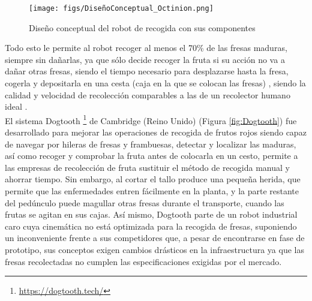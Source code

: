 \begin{figure} [H]
    \begin{center}
      \texttt{[image: figs/DiseñoConceptual\_Octinion.png]}
    \end{center}
    \caption{Diseño conceptual del robot de recogida con sus componentes}
    \label{fig:DiseñoConceptual_Octinion}
\end{figure}

Todo esto le permite al robot recoger al menos el 70\% de las fresas maduras, siempre sin dañarlas, ya que sólo decide recoger la fruta si su acción no va a dañar otras fresas, siendo el tiempo necesario para desplazarse hasta la fresa, cogerla y depositarla en una cesta (caja en la que se colocan las
fresas) %
, siendo la calidad y velocidad de recolección comparables a las de un recolector humano ideal \cite{DePreter18}.\\ %


El sistema Dogtooth \footnote{\url{https://dogtooth.tech/}} de Cambridge (Reino Unido) (Figura \ref{fig:Dogtooth}) fue desarrollado para mejorar las operaciones de recogida de frutos rojos siendo capaz de navegar por hileras de fresas y frambuesas, detectar y localizar las maduras, así como recoger y comprobar la fruta antes de colocarla en un cesto, permite a las empresas de recolección de fruta sustituir el método de recogida manual y ahorrar tiempo. Sin embargo, al cortar el tallo produce una pequeña herida, que permite que las enfermedades entren fácilmente en la planta, y la parte restante del pedúnculo puede magullar otras fresas durante el transporte, cuando las frutas se agitan en sus cajas. Así mismo, Dogtooth parte de un robot industrial caro cuya cinemática no está optimizada para la recogida de fresas, suponiendo un inconveniente frente a sus competidores que, a pesar de encontrarse en fase de prototipo, sus conceptos exigen cambios drásticos en la infraestructura ya que las fresas recolectadas no cumplen las especificaciones exigidas por el mercado. 

